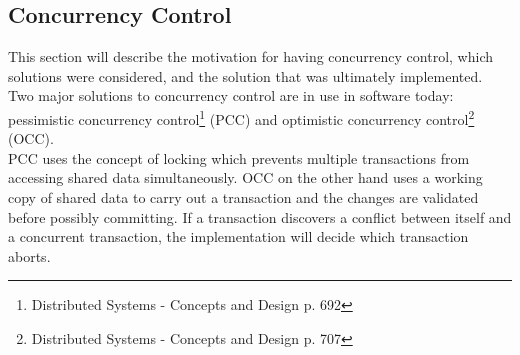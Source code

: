 \subsection{\label{ConcurrencyControl}Concurrency Control} 
This section will describe the motivation for having concurrency control, which solutions were considered, and the solution that was ultimately implemented.\\

Two major solutions to concurrency control are in use in software today: pessimistic concurrency control\footnote{Distributed Systems - Concepts and Design p. 692} (PCC) and optimistic concurrency control\footnote{Distributed Systems - Concepts and Design p. 707} (OCC).\\

PCC uses the concept of locking which prevents multiple transactions from accessing shared data simultaneously. OCC on the other hand uses a working copy of shared data to carry out a transaction and the changes are validated before possibly committing. If a transaction discovers a conflict between itself and a concurrent transaction, the implementation will decide which transaction aborts.



